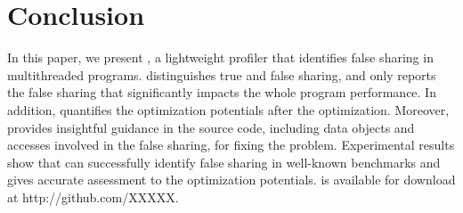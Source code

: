 \section{Conclusion}
\label{sec:conclusion}

In this paper, we present \cheetah{}, a lightweight profiler that identifies false sharing in multithreaded programs. \cheetah{} distinguishes true and false sharing, and only reports the false sharing that significantly impacts the whole program performance. In addition, \cheetah{} quantifies the optimization potentials after the optimization. Moreover, \cheetah{} provides insightful guidance in the source code, including data objects and accesses involved in the false sharing, for fixing the problem. Experimental results show that \cheetah{} can successfully identify false sharing in well-known benchmarks and gives accurate assessment to the optimization potentials. \Cheetah{} is available for download at http://github.com/XXXXX.



